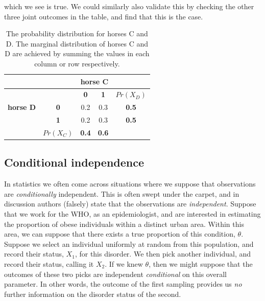 \documentclass[11pt,fullpage]{book}
\begin{document}
which we see is true. We could similarly also validate this by checking the other three joint outcomes in the table, and find that this is the case.

\begin{table}[htbp]
  \centering
    \begin{tabular}{rrccr}
    \toprule
          &       & \multicolumn{2}{c}{\textbf{horse C}} &  \\
    \midrule
          &       & \textbf{0} & \textbf{1} & \multicolumn{1}{c}{\textbf{$Pr(X_D)$}} \\
    \multicolumn{1}{c}{\textbf{horse D}} & \multicolumn{1}{c}{\textbf{0}} & 0.2   & 0.3   & \multicolumn{1}{c}{\textbf{0.5}} \\
    \multicolumn{1}{c}{} & \multicolumn{1}{c}{\textbf{1}} & 0.2   & 0.3   & \multicolumn{1}{c}{\textbf{0.5}} \\
          & \multicolumn{1}{c}{\textbf{$Pr(X_C)$}} & \textbf{0.4} & \textbf{0.6} & \multicolumn{1}{c}{} \\
    \bottomrule
    \end{tabular}%
  \caption{The probability distribution for horses C and D. The marginal distribution of horses C and D are achieved by summing the values in each column or row respectively.}\label{tab:Probability_horsesIndependent}%
\end{table}%

\subsection{Conditional independence}\label{sec:Probability_conditionalIndependence}
In statistics we often come across situations where we suppose that observations are \textit{conditionally} independent. This is often swept under the carpet, and in discussion authors (falsely) state that the observations are \textit{independent}. Suppose that we work for the WHO, as an epidemiologist, and are interested in estimating the proportion of obese individuals within a distinct urban area. Within this area, we can suppose that there exists a true proportion of this condition, $\theta$. Suppose we select an individual uniformly at random from this population, and record their status, $X_1$, for this disorder. We then pick another individual, and record their status, calling it $X_2$. If we knew $\theta$, then we might suppose that the outcomes of these two picks are independent \textit{conditional} on this overall parameter. In other words, the outcome of the first sampling provides us \textit{no} further information on the disorder status of the second.
\end{document}
